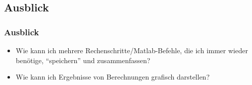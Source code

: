     \subsection{Ausblick}
    \begin{frame}
      \frametitle{Ausblick}
      \begin{itemize}
          \item Wie kann ich mehrere Rechenschritte/Matlab-Befehle, die ich immer wieder benötige, ``speichern'' und zusammenfassen?
          \item Wie kann ich Ergebnisse von Berechnungen grafisch darstellen?
      \end{itemize}
    \end{frame}



